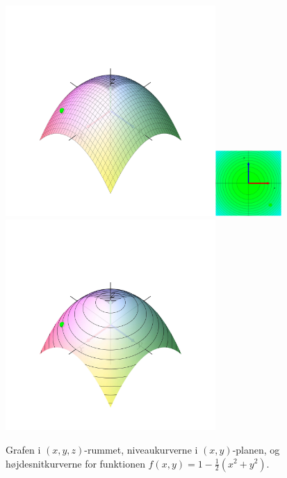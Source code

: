 \begin{figure}[h]
\centerline{\includegraphics[height=80mm]{plotParab.pdf}\quad \includegraphics[height=25mm]{plotParabNiveau.pdf} \quad \includegraphics[height=80mm]{plotParabNiveauUP.pdf}}
\begin{center}
\caption{Grafen i $(x,y,z)$-rummet, niveaukurverne i $(x,y)$-planen, og højdesnitkurverne for funktionen $f(x,y) = 1- \frac{1}{2}\left(x^{2} + y^{2} \right)$.} \label{figParab}
\end{center}
\end{figure}


